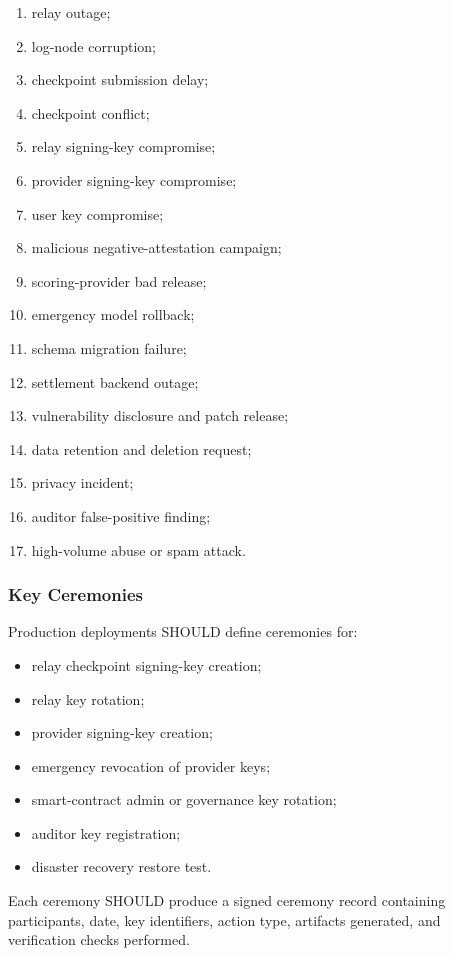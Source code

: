 \documentclass[11pt]{article}
\begin{document}
\begin{enumerate}
    \item relay outage;
    \item log-node corruption;
    \item checkpoint submission delay;
    \item checkpoint conflict;
    \item relay signing-key compromise;
    \item provider signing-key compromise;
    \item user key compromise;
    \item malicious negative-attestation campaign;
    \item scoring-provider bad release;
    \item emergency model rollback;
    \item schema migration failure;
    \item settlement backend outage;
    \item vulnerability disclosure and patch release;
    \item data retention and deletion request;
    \item privacy incident;
    \item auditor false-positive finding;
    \item high-volume abuse or spam attack.
\end{enumerate}

\subsubsection{Key Ceremonies}

Production deployments SHOULD define ceremonies for:

\begin{itemize}
    \item relay checkpoint signing-key creation;
    \item relay key rotation;
    \item provider signing-key creation;
    \item emergency revocation of provider keys;
    \item smart-contract admin or governance key rotation;
    \item auditor key registration;
    \item disaster recovery restore test.
\end{itemize}

Each ceremony SHOULD produce a signed ceremony record containing participants, date, key identifiers, action type, artifacts generated, and verification checks performed.
\end{document}
